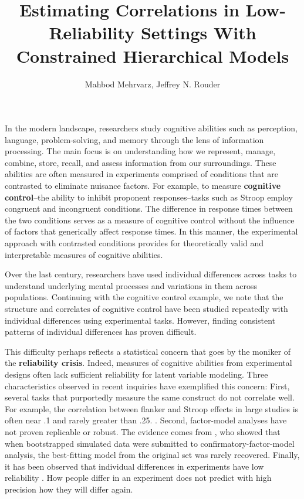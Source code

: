 \documentclass[man, 12pt]{apa7} %
\title{Estimating Correlations in Low-Reliability Settings With Constrained Hierarchical Models}
\author{Mahbod Mehrvarz, Jeffrey N. Rouder}
\affiliation{{University of California, Irvine}}
\begin{document}
\maketitle

In the modern landscape, researchers study cognitive abilities such as perception, language, problem-solving, and memory through the lens of information processing. The main focus is on understanding how we represent, manage, combine, store, recall, and assess information from our surroundings.  These abilities are often measured in experiments comprised of conditions that are contrasted to eliminate nuisance factors. For example, to measure \textbf{cognitive control}--the ability to inhibit proponent responses--tasks such as Stroop employ congruent and incongruent conditions. The difference in response times between the two conditions serves as a measure of cognitive control without the influence of factors that generically affect response times.  In this manner, the experimental approach with contrasted conditions provides for theoretically valid and interpretable measures of cognitive abilities. 

Over the last century, researchers have used individual differences across tasks to understand underlying mental processes and variations in them across populations.  Continuing with the cognitive control example, we note that the structure and correlates of cognitive control have been studied repeatedly with individual differences using experimental tasks. However, finding consistent patterns of individual differences has proven difficult. 

This difficulty perhaps reflects a statistical concern that goes by the moniker of the \textbf{reliability crisis}. Indeed, measures of cognitive abilities from experimental designs often lack sufficient reliability for latent variable modeling. Three characteristics observed in recent inquiries have exemplified this concern: First, several tasks that purportedly measure the same construct do not correlate well. For example, the correlation between flanker and Stroop effects in large studies is often near .1 and rarely greater than .25. \parencite{Enkavi.etal.2019, Rey-Mermet.etal.2019, Rouder.etal.2023}. Second, factor-model analyses have not proven replicable or robust.  The evidence comes from \Textcite{Karr.etal.2018}, who showed that when bootstrapped simulated data were submitted to confirmatory-factor-model analysis, the best-fitting model from the original set was rarely recovered. Finally, it has been observed that individual differences in experiments have low reliability \parencite{Hedge.etal.2018, Draheim.etal.2019}.  How people differ in an experiment does not predict with high precision how they will differ again.
\end{document}
